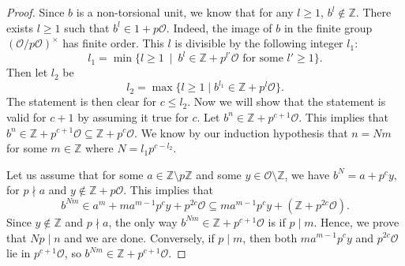 \documentclass[11pt,letterpaper]{amsart}
\theoremstyle{definition}
\theoremstyle{remark}
\newcommand{\cal}[1]{\mathcal{#1}}
\newcommand{\bb}[1]{\mathbb{#1}}
\newcommand{\Z}{\bb Z}
\newcommand{\calO}{\cal O}
\begin{document}
	\begin{proof}
		Since $b$ is a non-torsional unit, we know that for any $l\geq 1$, $b^{l} \notin \Z$. 
		There exists $l\geq 1$ such that $b^{l} \in 1 + p \calO$. Indeed, the image of $b$ in the finite group $(\calO/p\calO)^{\times}$ has finite order. 
		This $l$ is divisible by the following integer $l_1$:
		\begin{equation}
			\label{eq:l1def}
			l_1 = \min\{l \geq 1\  \mid\  b^{l}\in \Z + p^{l'} \calO \text{ for some }l' \geq 1\}.
		\end{equation}
		Then let $l_2$ be
		\begin{equation}
			\label{eq:l2def}
			l_2 = \max \{ l \geq 1 \mid  b^{l_1} \in \Z+p^{l}\calO\}.
		\end{equation}
		The statement is then clear for $c \leq l_2$. Now we will show that the statement is valid for $c+1$ by assuming it true for $c$. 
		Let $b^{n}   \in \Z + p^{c+1} \calO$.
		This implies that 
		$b^{n} \in \Z + p^{c+1} \calO \subseteq \Z + p^{c} \calO$.
		We know by our induction hypothesis that $n =  N m$ for some $m \in \mathbb{Z}$ where $N= l_1p^{c-l_2}$. 
		
		Let us assume that for some $a \in \Z \setminus p \Z$ and some $y \in \calO \setminus \Z$, we have
		$b^{N}= a + p^{c}y,$ for $p \nmid a$ and $y \notin \mathbb{Z} + p \mathcal{O}$.
		This implies that 
		\begin{equation}
			b^{Nm} \in a^{m} + m a^{m-1}p^{c}y + p^{2c} \calO \subseteq ma^{m-1} p^{c} y +  \left(  \Z + p^{2c}\calO \right). 
		\end{equation}
		Since $y \notin \Z$ and $p \nmid a$, the only way $b^{Nm} \in \Z + p^{c+1} \calO$ is if $p \mid m$. Hence, we prove that $Np \mid n$ and we are done.
		Conversely, if $p\mid m$, then both $ma^{m-1}p^cy$ and $p^{2c}\calO$ lie in $p^{c+1}\calO$, so
  $b^{Nm}\in\Z+p^{c+1}\calO$.
	\end{proof}
\end{document}

